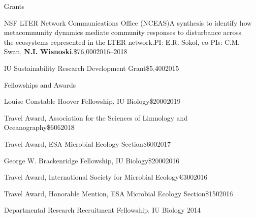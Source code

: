 \documentclass{resume} %
\begin{document}
\begin{rSection}{Grants}

\begin{Grant}{NSF LTER Network Communications Office (NCEAS)}{A synthesis to identify how metacommunity dynamics mediate community responses to disturbance across the ecosystems represented in the LTER network.}{PI: E.R. Sokol, co-PIs: C.M. Swan, {\bf N.I. Wisnoski}.}{\$76,000}{2016--2018}
\end{Grant}


\begin{Grant}{IU Sustainability Research Development Grant}{}{}{\$5,400}{2015}
\end{Grant}

\end{rSection}

\bigskip

\begin{rSection}{Fellowships and Awards}

\begin{Award}{Louise Constable Hoover Fellowship, IU Biology}{\$2000}{2019}
\end{Award}

\begin{Award}{Travel Award, Association for the Sciences of Limnology and Oceanography}{\$606}{2018}
\end{Award}

\begin{Award}{Travel Award, ESA Microbial Ecology Section}{\$600}{2017}
\end{Award}

\begin{Award}{George W. Brackenridge Fellowship, IU Biology}{\$2000}{2016}
\end{Award}

\begin{Award}{Travel Award, International Society for Microbial Ecology}{\euro{}300}{2016}
\end{Award}

\begin{Award}{Travel Award, Honorable Mention, ESA Microbial Ecology Section}{\$150}{2016}
\end{Award}

\begin{Award}{Departmental Research Recruitment Fellowship, IU Biology}{ }{2014}
\end{Award}

\end{rSection}
\end{document}
